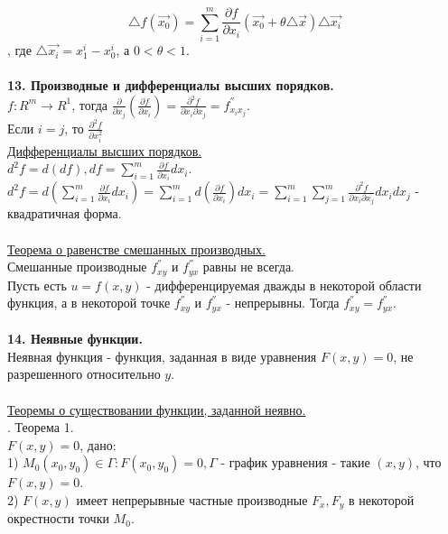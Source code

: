 \documentclass[12pt]{article}
\begin{document}
$${\bigtriangleup f(\overrightarrow{x_0})}=\sum_{i=1}^m \frac{\partial f}{\partial x_i} (\overrightarrow{x_0}+\theta {\bigtriangleup \overrightarrow{x}}){\bigtriangleup \overrightarrow{x_i}}$$,
где ${\bigtriangleup \overrightarrow{x_i}} = x_1^i - x_0^i$, а $0<\theta<1$.\\
\\
\label{question13_1}\textbf{13. Производные и дифференциалы высших порядков.}\\
$f: R^m \to R^1$, тогда $\frac{\partial}{\partial x_j}(\frac{\partial f}{\partial x_i}) = \frac{\partial^2 f}{\partial x_i \partial x_j} = f_{x_i x_j}^{''}$.\\
Если $i = j$, то $\frac{\partial^2 f}{\partial x_i^2}$\\
\underline{Дифференциалы высших порядков.}\\
$d^2 f = d(df), df = \sum_{i=1}^m \frac{\partial f}{\partial x_i} dx_i$.\\
$d^2 f = d(\sum_{i=1}^m \frac{\partial f}{\partial x_i} dx_i) = \sum_{i=1}^m d(\frac{\partial f}{\partial x_i}) dx_i = \sum_{i=1}^m \sum_{j=1}^m \frac{\partial^2 f}{\partial x_i \partial x_j} dx_i dx_j$ - квадратичная форма.\\
\\
\label{question13_2}\underline{Теорема о равенстве смешанных производных.}\\
Смешанные производные $f_{xy}^{''}$ и $f_{yx}^{''}$ равны не всегда.\\
Пусть есть $u = f(x,y)$ - дифференцируемая дважды в некоторой области функция, а в некоторой точке $f_{xy}^{''}$ и $f_{yx}^{''}$ - непрерывны. Тогда $f_{xy}^{''}=f_{yx}^{''}$.\\
\\
\label{question14_1}\textbf{14. Неявные функции.}\\
Неявная функция - функция, заданная в виде уравнения $F(x,y) = 0$, не разрешенного относительно $y$.\\
\\
\label{question14_2}\uline{Теоремы о существовании функции, заданной неявно.}\\
. Теорема 1.\\
$F(x,y)=0$, дано:\\
1) $M_0(x_0,y_0) \in \Gamma : F(x_0,y_0) = 0, \Gamma$ - график уравнения - такие $(x,y)$, что $F(x,y)=0$.\\
2) $F(x,y)$ имеет непрерывные частные производные $F_x, F_y$ в некоторой окрестности точки $M_0$.\\
\end{document}
